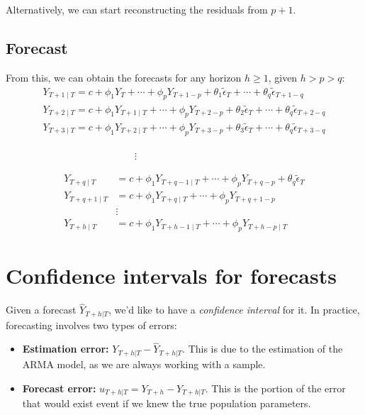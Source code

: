 \documentclass[11pt, a4paper]{report}
\theoremstyle{plain}
\theoremstyle{plain}
\theoremstyle{remark}
\begin{document}
Alternatively, we can start reconstructing the residuals from $p+1$. 

\subsection{Forecast}

From this, we can obtain the forecasts for any horizon $h \geq 1$, given $h>p>q$: 
$$\begin{array}{l}
	Y_{T+1 \mid T}=c+\phi_{1} Y_{T}+\cdots+\phi_{p} Y_{T+1-p}+\theta_{1} \widetilde{\epsilon}_{T}+\cdots+\theta_{q} \widetilde{\epsilon}_{T+1-q} \\
	Y_{T+2 \mid T}=c+\phi_{1} Y_{T+1 \mid T}+\cdots+\phi_{p} Y_{T+2-p}+\theta_{2} \widetilde{\epsilon}_{T}+\cdots+\theta_{q} \widetilde{\epsilon}_{T+2-q} \\
	Y_{T+3 \mid T}=c+\phi_{1} Y_{T+2 \mid T}+\cdots+\phi_{p} Y_{T+3-p}+\theta_{3} \widetilde{\epsilon}_{T}+\cdots+\theta_{q} \widetilde{\epsilon}_{T+3-q}
\end{array}$$

$ \hspace{13em} \vdots$

$$\begin{aligned}
	Y_{T+q \mid T} &=c+\phi_{1} Y_{T+q-1 \mid T}+\cdots+\phi_{p} Y_{T+q-p}+\theta_{q} \widetilde{\epsilon}_{T} \\
	Y_{T+q+1 \mid T} &=c+\phi_{1} Y_{T+q \mid T}+\cdots+\phi_{p} Y_{T+q+1-p} \\
	& \vdots \\
	Y_{T+h \mid T} &=c+\phi_{1} Y_{T+h-1 \mid T}+\cdots+\phi_{p} Y_{T+h-p \mid T}
\end{aligned}$$

\section{Confidence intervals for forecasts}

Given a forecast $\hat{Y}_{T+h|T}$, we'd like to have a \textit{confidence interval} for it. In practice, forecasting involves two types of errors:
\begin{itemize}
	\item \textbf{Estimation error:} $Y_{T+h|T} - \hat{Y}_{T+h|T}$. This is due to the estimation of the ARMA model, as we are always working with a sample.
	\item \textbf{Forecast error:} $u_{T+h|T} = Y_{T+h} - Y_{T+h|T}$. This is the portion of the error that would exist event if we knew the true population parameters.
\end{itemize}
\end{document}
